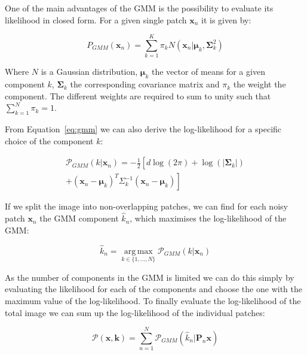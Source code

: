 \documentclass[twocolumn]{aastex631}
\DeclareMathOperator*{\argmax}{arg\,max}
\begin{document}
    One of the main advantages of the GMM is the possibility to evaluate its likelihood
    in closed form. For a given single patch $\mathbf{x}_n$ it is given by:

    \begin{equation}
        \label{eq:gmm}
        P_{GMM}(\mathbf{x}_n) = \sum_{k=1}^K \pi_k N(\mathbf{x}_n| \boldsymbol{\mu}_k, \boldsymbol{\Sigma}_k^2)
    \end{equation}

    Where $N$ is a Gaussian distribution, $\boldsymbol{\mu}_k$ the vector of means for
    a given component $k$, $\boldsymbol{\Sigma}_k$ the corresponding covariance matrix
    and $\pi_k$ the weight the component. The different weights are required to sum to unity such that $\sum_{k=1}^N\pi_k = 1$. 

    From Equation~\ref{eq:gmm} we can also derive the log-likelihood for a specific choice of the component $k$:
        
    \begin{equation}
    \begin{split}
    \mathcal{P}_{GMM}(k| \mathbf{x}_n) = -\frac{1}{2} \left[ \right. d \log(2\pi)
    + \log(|\boldsymbol \Sigma_{k}|)\\
    + (\mathbf{x}_n - \boldsymbol{\mu}_{k})^T \Sigma^{-1}_{k}(\mathbf{x}_n - \boldsymbol{\mu}_{k}) \left. \right]
    \end{split}
    \end{equation}

    If we split the image into non-overlapping patches, we can find for each noisy patch $\mathbf{x}_n$ the GMM component $\hat{k}_n$, which maximises the log-likelihood of the GMM:
        
    \begin{equation}
        \hat{k}_n = \underset{k \in \{1, ..., N\} }{\argmax}{\mathcal{P}_{GMM}(k| \mathbf{x}_n)}
    \end{equation}
    \vspace{0.2em}

    As the number of components in the GMM is limited we can do this simply by evaluating the likelihood for each of the components and choose the one with
    the maximum value of the log-likelihood. To finally evaluate the log-likelihood
    of the total image we can sum up the log-likelihood of the individual patches: 

    \begin{equation}
        \mathcal{P}(\mathbf{x}, \mathbf{k}) = \sum_{n = 1}^N \mathcal{P}_{GMM}(\hat{k}_n | \mathbf{P}_n \mathbf{x})
    \end{equation}
\end{document}
